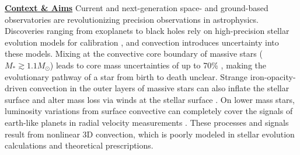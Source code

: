 \documentclass[12pt]{article}
\newcommand{\sct}[1]{\vspace{0.3cm}\hspace{-\parindent}\textbf{\underline{#1}}\hspace{0.3cm}}
\begin{document}
\thispagestyle{fancy}

\sct{Context \& Aims}
Current and next-generation space- and ground-based observatories are revolutionizing precision observations in astrophysics.
%
%
Discoveries ranging from exoplanets to black holes rely on high-precision stellar evolution models for calibration \citep{mesa6}, and convection introduces uncertainty into these models.
Mixing at the convective core boundary of massive stars ($M_* \gtrsim 1.1 M_\odot$) leads to core mass uncertainties of up to 70\% \citep{kaiser_etal_2020}, making the evolutionary pathway of a star from birth to death unclear.
Strange iron-opacity-driven convection in the outer layers of massive stars can also inflate the stellar surface and alter mass loss via winds at the stellar surface \citep{kohler_etal_2015}.
On lower mass stars, luminosity variations from surface convective can completely cover the signals of earth-like planets in radial velocity measurements \citep{crass_etal_2021}.
These processes and signals result from nonlinear 3D convection, which is poorly modeled in stellar evolution calculations and theoretical prescriptions.
\end{document}
